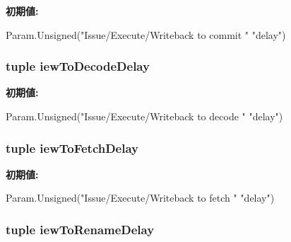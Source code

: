 \label{classOzoneCPU_1_1DerivOzoneCPU_a724a185702137da4a74c263b1ea63fec}
{\bfseries 初期値:}
\begin{DoxyCode}
Param.Unsigned("Issue/Execute/Writeback to commit "
               "delay")
\end{DoxyCode}
\hypertarget{classOzoneCPU_1_1DerivOzoneCPU_a9876f37ad91dd63a32345b53aafbddc6}{
\subsubsection[{iewToDecodeDelay}]{\setlength{\rightskip}{0pt plus 5cm}tuple {\bf iewToDecodeDelay}}}
\label{classOzoneCPU_1_1DerivOzoneCPU_a9876f37ad91dd63a32345b53aafbddc6}
{\bfseries 初期値:}
\begin{DoxyCode}
Param.Unsigned("Issue/Execute/Writeback to decode "
               "delay")
\end{DoxyCode}
\hypertarget{classOzoneCPU_1_1DerivOzoneCPU_a63165fb771c6aa1ecca842abe393a831}{
\subsubsection[{iewToFetchDelay}]{\setlength{\rightskip}{0pt plus 5cm}tuple {\bf iewToFetchDelay}}}
\label{classOzoneCPU_1_1DerivOzoneCPU_a63165fb771c6aa1ecca842abe393a831}
{\bfseries 初期値:}
\begin{DoxyCode}
Param.Unsigned("Issue/Execute/Writeback to fetch "
               "delay")
\end{DoxyCode}
\hypertarget{classOzoneCPU_1_1DerivOzoneCPU_a54dd22869ae708c0b6bffab65d4d03c5}{
\subsubsection[{iewToRenameDelay}]{\setlength{\rightskip}{0pt plus 5cm}tuple {\bf iewToRenameDelay}}}
